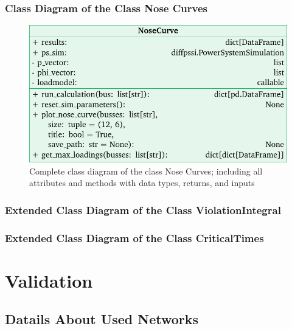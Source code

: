 \subsection{Class Diagram of the Class Nose Curves}
\label{app:nose-curve}

\begin{figure}[H]
    \centering
    \includegraphics[width=12cm]{tikz_graphics/images/class_diagram_nosecurve_complete.pdf}
    \caption{Complete class diagram of the class Nose Curves; including all attributes and methods with data types, returns, and inputs}
    \label{fig:class-diagram-nose-curves}
\end{figure}


\subsection{Extended Class Diagram of the Class ViolationIntegral}
\subsection{Extended Class Diagram of the Class CriticalTimes}



\chapter{Validation}
\label{app:validation}

\section{Datails About Used Networks}
\label{app:networks}

